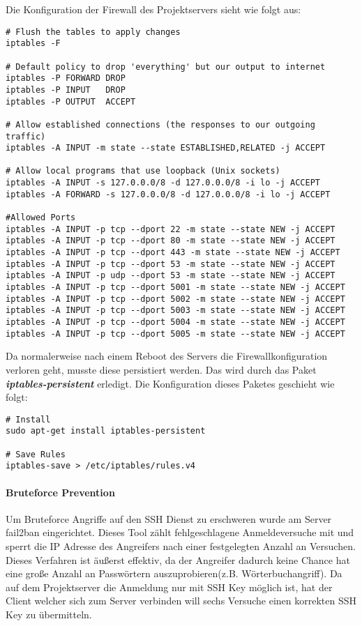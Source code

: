 Die Konfiguration der Firewall des Projektservers sieht wie folgt aus:
\begin{lstlisting}[caption = Firewall Rules des Projektservers, label = firewall1]
# Flush the tables to apply changes
iptables -F

# Default policy to drop 'everything' but our output to internet
iptables -P FORWARD DROP
iptables -P INPUT   DROP
iptables -P OUTPUT  ACCEPT

# Allow established connections (the responses to our outgoing traffic)
iptables -A INPUT -m state --state ESTABLISHED,RELATED -j ACCEPT

# Allow local programs that use loopback (Unix sockets)
iptables -A INPUT -s 127.0.0.0/8 -d 127.0.0.0/8 -i lo -j ACCEPT
iptables -A FORWARD -s 127.0.0.0/8 -d 127.0.0.0/8 -i lo -j ACCEPT

#Allowed Ports
iptables -A INPUT -p tcp --dport 22 -m state --state NEW -j ACCEPT
iptables -A INPUT -p tcp --dport 80 -m state --state NEW -j ACCEPT
iptables -A INPUT -p tcp --dport 443 -m state --state NEW -j ACCEPT
iptables -A INPUT -p tcp --dport 53 -m state --state NEW -j ACCEPT
iptables -A INPUT -p udp --dport 53 -m state --state NEW -j ACCEPT
iptables -A INPUT -p tcp --dport 5001 -m state --state NEW -j ACCEPT
iptables -A INPUT -p tcp --dport 5002 -m state --state NEW -j ACCEPT
iptables -A INPUT -p tcp --dport 5003 -m state --state NEW -j ACCEPT
iptables -A INPUT -p tcp --dport 5004 -m state --state NEW -j ACCEPT
iptables -A INPUT -p tcp --dport 5005 -m state --state NEW -j ACCEPT
\end{lstlisting}

Da normalerweise nach einem Reboot des Servers die Firewallkonfiguration verloren geht, musste diese persistiert werden. Das wird durch das Paket \textbf{\textit{iptables-persistent}} erledigt. Die Konfiguration dieses Paketes geschieht wie folgt\cite{FIREWALL_PERSISTENT}:

\begin{lstlisting}[caption = Installation iptables-persistent, label = firewall2]
# Install
sudo apt-get install iptables-persistent

# Save Rules
iptables-save > /etc/iptables/rules.v4
\end{lstlisting}

\paragraph{Bruteforce Prevention}
Um Bruteforce Angriffe auf den SSH Dienst zu erschweren wurde am Server fail2ban eingerichtet. Dieses Tool zählt fehlgeschlagene Anmeldeversuche mit und sperrt die IP Adresse des Angreifers nach einer festgelegten Anzahl an Versuchen. Dieses Verfahren ist äußerst effektiv, da der Angreifer dadurch keine Chance hat eine große Anzahl an Passwörtern auszuprobieren(z.B. Wörterbuchangriff). Da auf dem Projektserver die Anmeldung nur mit SSH Key möglich ist, hat der Client welcher sich zum Server verbinden will sechs Versuche einen korrekten SSH Key zu übermitteln.
